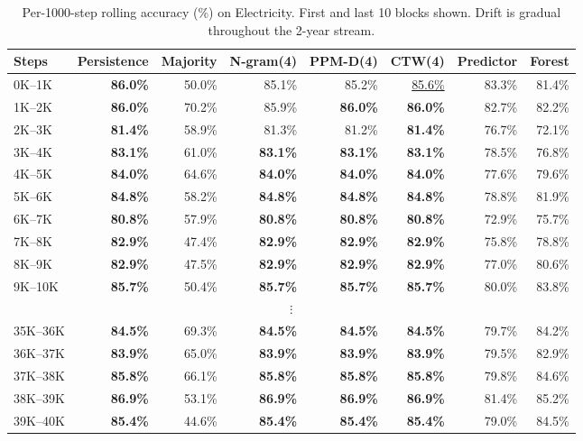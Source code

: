 \begin{table}[h]
\centering
\caption{Per-1000-step rolling accuracy (\%) on Electricity. First and last 10 blocks shown. Drift is gradual throughout the 2-year stream.}
\label{tab:electricity_blocks}
\begin{tabular}{lrrrrrrr}
\toprule
Steps & Persistence & Majority & N-gram(4) & PPM-D(4) & CTW(4) & Predictor & Forest \\
\midrule
0K--1K & \textbf{86.0\%} & 50.0\% & 85.1\% & 85.2\% & \underline{85.6\%} & 83.3\% & 81.4\% \\
1K--2K & \textbf{86.0\%} & 70.2\% & 85.9\% & \textbf{86.0\%} & \textbf{86.0\%} & 82.7\% & 82.2\% \\
2K--3K & \textbf{81.4\%} & 58.9\% & 81.3\% & 81.2\% & \textbf{81.4\%} & 76.7\% & 72.1\% \\
3K--4K & \textbf{83.1\%} & 61.0\% & \textbf{83.1\%} & \textbf{83.1\%} & \textbf{83.1\%} & 78.5\% & 76.8\% \\
4K--5K & \textbf{84.0\%} & 64.6\% & \textbf{84.0\%} & \textbf{84.0\%} & \textbf{84.0\%} & 77.6\% & 79.6\% \\
5K--6K & \textbf{84.8\%} & 58.2\% & \textbf{84.8\%} & \textbf{84.8\%} & \textbf{84.8\%} & 78.8\% & 81.9\% \\
6K--7K & \textbf{80.8\%} & 57.9\% & \textbf{80.8\%} & \textbf{80.8\%} & \textbf{80.8\%} & 72.9\% & 75.7\% \\
7K--8K & \textbf{82.9\%} & 47.4\% & \textbf{82.9\%} & \textbf{82.9\%} & \textbf{82.9\%} & 75.8\% & 78.8\% \\
8K--9K & \textbf{82.9\%} & 47.5\% & \textbf{82.9\%} & \textbf{82.9\%} & \textbf{82.9\%} & 77.0\% & 80.6\% \\
9K--10K & \textbf{85.7\%} & 50.4\% & \textbf{85.7\%} & \textbf{85.7\%} & \textbf{85.7\%} & 80.0\% & 83.8\% \\
\multicolumn{8}{c}{$\vdots$} \\
35K--36K & \textbf{84.5\%} & 69.3\% & \textbf{84.5\%} & \textbf{84.5\%} & \textbf{84.5\%} & 79.7\% & 84.2\% \\
36K--37K & \textbf{83.9\%} & 65.0\% & \textbf{83.9\%} & \textbf{83.9\%} & \textbf{83.9\%} & 79.5\% & 82.9\% \\
37K--38K & \textbf{85.8\%} & 66.1\% & \textbf{85.8\%} & \textbf{85.8\%} & \textbf{85.8\%} & 79.8\% & 84.6\% \\
38K--39K & \textbf{86.9\%} & 53.1\% & \textbf{86.9\%} & \textbf{86.9\%} & \textbf{86.9\%} & 81.4\% & 85.2\% \\
39K--40K & \textbf{85.4\%} & 44.6\% & \textbf{85.4\%} & \textbf{85.4\%} & \textbf{85.4\%} & 79.0\% & 84.5\% \\

\end{tabular}
\end{table}
